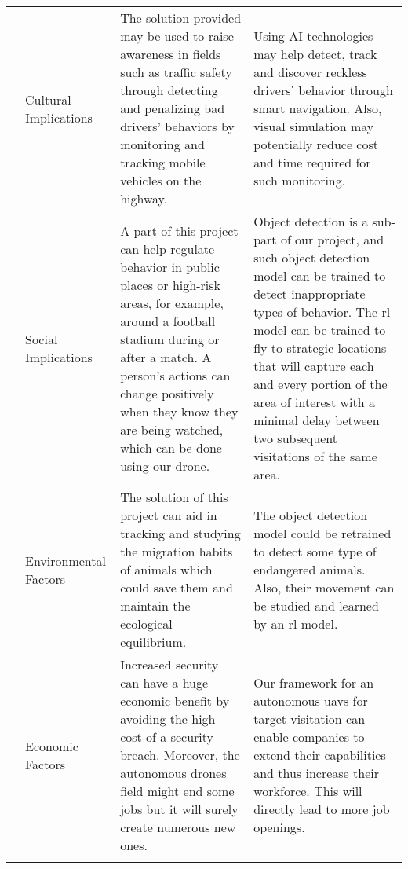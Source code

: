 \documentclass[../main.tex]{subfiles}
\begin{document}
\begin{center}
\begin{xltabular}{\textwidth}{ c L{2.5cm} X X }
	\showimpactcounter
	& Cultural Implications 
        & The solution provided may be used to raise awareness in
        fields such as traffic safety through detecting and penalizing
        bad drivers' behaviors by monitoring and tracking mobile
        vehicles on the highway.
        & Using AI technologies may help detect, track and discover
        reckless drivers' behavior through smart navigation. 
        Also, visual simulation may potentially reduce cost and time
        required for such monitoring.
        \\ \addlinespace
	
	\showimpactcounter
	& Social Implications
	& A part of this project can help regulate behavior in public
        places or high-risk areas, for example, around a football
        stadium during or after a match.
        A person's actions can change positively when they know they are
        being watched, which can be done using our drone.
        & Object detection is a sub-part of our project, and such
        object detection model can be trained to detect inappropriate
        types of behavior.
        The \gls{rl} model can be trained to fly to strategic
        locations that will capture each and every portion of the area
        of interest with a minimal delay between two subsequent
        visitations of the same area.
        \\ \addlinespace
	
	\showimpactcounter
	& Environmental Factors
        & The solution of this project can aid in tracking and
        studying the migration habits of animals which could save them
        and maintain the ecological equilibrium.
        & The object detection model could be retrained to detect some
        type of endangered animals. 
        Also, their movement can be studied and learned by an \gls{rl}
        model.
        \\ \addlinespace
	
	\showimpactcounter
	& Economic Factors  
        & Increased security can have a huge economic benefit by
        avoiding the high cost of a security breach. 
        Moreover, the autonomous drones field might end some jobs but
        it will surely create numerous new ones.
	& Our framework for an autonomous \glspl{uav} for target
        visitation can enable companies to extend their capabilities
        and thus increase their workforce.
        This will directly lead to more job openings.
        \\ \addlinespace
	
	\bottomrule		
    \end{xltabular}
\end{center}
\end{document}
